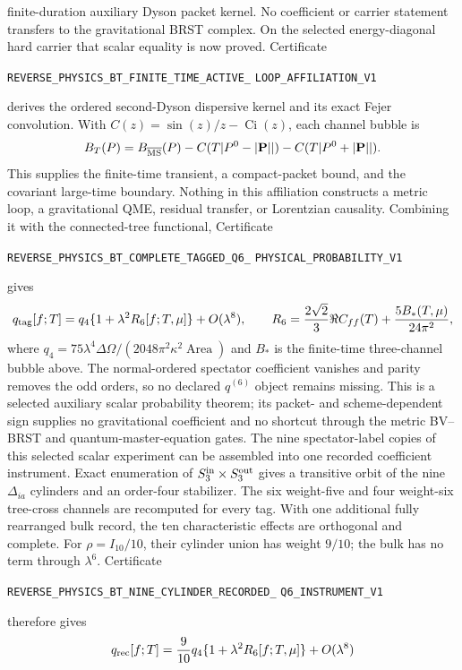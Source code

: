 \documentclass[11pt]{article}
\theoremstyle{definition}
\theoremstyle{remark}
\begin{document}
finite-duration auxiliary Dyson packet kernel.  No coefficient or carrier
statement transfers to the gravitational BRST complex.
On the selected energy-diagonal hard carrier that scalar equality is now
proved.  Certificate
\par\noindent
\texttt{REVERSE\_PHYSICS\_BT\_FINITE\_TIME\_ACTIVE\_}
\allowbreak\texttt{LOOP\_AFFILIATION\_V1}
\par\noindent
derives the ordered second-Dyson dispersive kernel and its exact Fejer
convolution.  With $C(z)=\sin(z)/z-\operatorname{Ci}(z)$, each channel bubble
is
\[
 B_T(P)=B_{\overline{\rm MS}}(P)
 -C(T|P^0-|\mathbf P||)-C(T|P^0+|\mathbf P||).
\]
This supplies the finite-time transient, a compact-packet bound, and the
covariant large-time boundary.  Nothing in this affiliation constructs a
metric loop, a gravitational QME, residual transfer, or Lorentzian causality.
Combining it with the connected-tree functional, Certificate
\par\noindent
\texttt{REVERSE\_PHYSICS\_BT\_COMPLETE\_TAGGED\_Q6\_}
\allowbreak\texttt{PHYSICAL\_PROBABILITY\_V1}
\par\noindent
gives
\[
 q_{\rm tag}[f;T]=q_4\{1+\lambda^2R_6[f;T,\mu]\}+O(\lambda^8),
 \qquad
 R_6={2\sqrt2\over3}\Re C_{ff}(T)+{5B_*(T,\mu)\over24\pi^2},
\]
where $q_4=75\lambda^4\Delta\Omega/(2048\pi^2\kappa^2
\operatorname{Area})$ and $B_*$ is the finite-time three-channel bubble
above.  The normal-ordered spectator coefficient vanishes and parity removes
the odd orders, so no declared $q^{(6)}$ object remains missing.  This is a
selected auxiliary scalar probability theorem; its packet- and
scheme-dependent sign supplies no gravitational coefficient and no shortcut
through the metric BV--BRST and quantum-master-equation gates.
The nine spectator-label copies of this selected scalar experiment can be
assembled into one recorded coefficient instrument.  Exact enumeration of
$S_3^{\rm in}\times S_3^{\rm out}$ gives a transitive orbit of the nine
$\Delta_{ia}$ cylinders and an order-four stabilizer.  The six weight-five
and four weight-six tree-cross channels are recomputed for every tag.  With
one additional fully rearranged bulk record, the ten characteristic effects
are orthogonal and complete.  For $\rho=I_{10}/10$, their cylinder union has
weight $9/10$; the bulk has no term through $\lambda^6$.  Certificate
\par\noindent
\texttt{REVERSE\_PHYSICS\_BT\_NINE\_CYLINDER\_RECORDED\_}
\allowbreak\texttt{Q6\_INSTRUMENT\_V1}
\par\noindent
therefore gives
\[
 q_{\rm rec}[f;T]
 ={9\over10}q_4\{1+\lambda^2R_6[f;T,\mu]\}+O(\lambda^8)
\]
\end{document}
